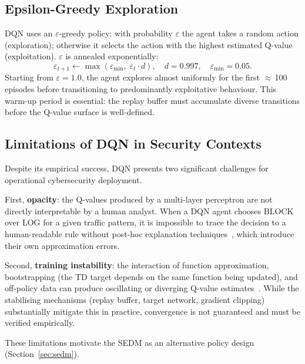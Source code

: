 \subsection{Epsilon-Greedy Exploration}

DQN uses an $\varepsilon$-greedy policy: with probability $\varepsilon$
the agent takes a random action (exploration); otherwise it selects the
action with the highest estimated Q-value (exploitation).
$\varepsilon$ is annealed exponentially:
%
\begin{equation}
  \varepsilon_{t+1} \leftarrow \max\!\left(\varepsilon_{\min},\;
                                            \varepsilon_t \cdot d\right),
  \quad d = 0.997,\quad \varepsilon_{\min} = 0.05.
\end{equation}
%
Starting from $\varepsilon = 1.0$, the agent explores almost uniformly for
the first $\approx$\,100 episodes before transitioning to predominantly
exploitative behaviour.
This warm-up period is essential: the replay buffer must accumulate diverse
transitions before the Q-value surface is well-defined.

\subsection{Limitations of DQN in Security Contexts}

Despite its empirical success, DQN presents two significant challenges for
operational cybersecurity deployment.

First, \textbf{opacity}: the Q-values produced by a multi-layer perceptron
are not directly interpretable by a human analyst.
When a DQN agent chooses BLOCK over LOG for a given traffic pattern, it is
impossible to trace the decision to a human-readable rule without
post-hoc explanation techniques~\citep{lundberg2017unified}, which introduce
their own approximation errors.

Second, \textbf{training instability}: the interaction of function
approximation, bootstrapping (the TD target depends on the same function
being updated), and off-policy data can produce oscillating or diverging
Q-value estimates~\citep{van2016deep}.
While the stabilising mechanisms (replay buffer, target network, gradient
clipping) substantially mitigate this in practice, convergence is not
guaranteed and must be verified empirically.

These limitations motivate the SEDM as an alternative policy design
(Section~\ref{sec:sedm}).

